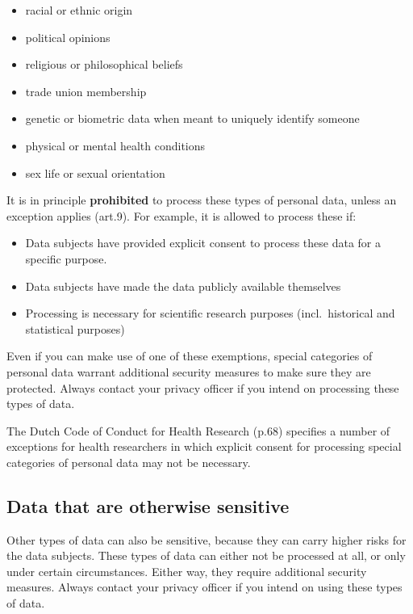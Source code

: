 \documentclass[
]{book}
\providecommand{\tightlist}{%
  \setlength{\itemsep}{0pt}\setlength{\parskip}{0pt}}
\begin{document}
\begin{itemize}
\tightlist
\item
  racial or ethnic origin
\item
  political opinions
\item
  religious or philosophical beliefs
\item
  trade union membership
\item
  genetic or biometric data when meant to uniquely identify someone
\item
  physical or mental health conditions
\item
  sex life or sexual orientation
\end{itemize}

It is in principle \textbf{prohibited} to process these types of personal data,
unless an exception applies
(art.9).
For example, it is allowed to process these if:

\begin{itemize}
\tightlist
\item
  Data subjects have provided explicit consent to process these data for a
  specific purpose.
\item
  Data subjects have made the data publicly available themselves
\item
  Processing is necessary for scientific research purposes (incl.~historical
  and statistical purposes)
\end{itemize}

Even if you can make use of one of these exemptions, special categories of
personal data warrant additional security measures to make sure they are
protected. Always contact your
privacy officer
if you intend on processing these types of data.

The
Dutch Code of Conduct for Health Research
(p.68) specifies a number of exceptions for health researchers in which explicit
consent for processing special categories of personal data may not be necessary.

\hypertarget{data-that-are-otherwise-sensitive}{%
\subsection{Data that are otherwise sensitive}\label{data-that-are-otherwise-sensitive}}

Other types of data can also be sensitive, because they can carry higher risks
for the data subjects. These types of data can either not be processed at all,
or only under certain circumstances. Either way, they require additional
security measures. Always contact your
privacy officer
if you intend on using these types of data.
\end{document}
